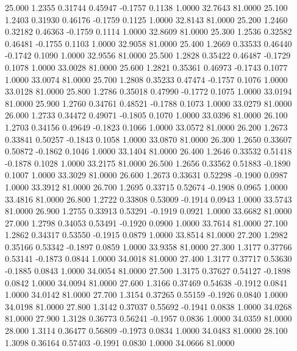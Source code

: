   25.000   1.2355   0.31744   0.45947  -0.1757   0.1138   1.0000  32.7643  81.0000
  25.100   1.2403   0.31930   0.46176  -0.1759   0.1125   1.0000  32.8143  81.0000
  25.200   1.2460   0.32182   0.46363  -0.1759   0.1114   1.0000  32.8609  81.0000
  25.300   1.2536   0.32582   0.46481  -0.1755   0.1103   1.0000  32.9058  81.0000
  25.400   1.2669   0.33533   0.46440  -0.1742   0.1090   1.0000  32.9556  81.0000
  25.500   1.2828   0.35422   0.46487  -0.1729   0.1078   1.0000  33.0028  81.0000
  25.600   1.2821   0.35361   0.46973  -0.1743   0.1077   1.0000  33.0074  81.0000
  25.700   1.2808   0.35233   0.47474  -0.1757   0.1076   1.0000  33.0128  81.0000
  25.800   1.2786   0.35018   0.47990  -0.1772   0.1075   1.0000  33.0194  81.0000
  25.900   1.2760   0.34761   0.48521  -0.1788   0.1073   1.0000  33.0279  81.0000
  26.000   1.2733   0.34472   0.49071  -0.1805   0.1070   1.0000  33.0396  81.0000
  26.100   1.2703   0.34156   0.49649  -0.1823   0.1066   1.0000  33.0572  81.0000
  26.200   1.2673   0.33841   0.50257  -0.1843   0.1058   1.0000  33.0870  81.0000
  26.300   1.2650   0.33607   0.50872  -0.1862   0.1046   1.0000  33.1404  81.0000
  26.400   1.2646   0.33532   0.51418  -0.1878   0.1028   1.0000  33.2175  81.0000
  26.500   1.2656   0.33562   0.51883  -0.1890   0.1007   1.0000  33.3029  81.0000
  26.600   1.2673   0.33631   0.52298  -0.1900   0.0987   1.0000  33.3912  81.0000
  26.700   1.2695   0.33715   0.52674  -0.1908   0.0965   1.0000  33.4816  81.0000
  26.800   1.2722   0.33808   0.53009  -0.1914   0.0943   1.0000  33.5743  81.0000
  26.900   1.2755   0.33913   0.53291  -0.1919   0.0921   1.0000  33.6682  81.0000
  27.000   1.2798   0.34053   0.53491  -0.1920   0.0900   1.0000  33.7614  81.0000
  27.100   1.2862   0.34317   0.53550  -0.1915   0.0879   1.0000  33.8514  81.0000
  27.200   1.2982   0.35166   0.53342  -0.1897   0.0859   1.0000  33.9358  81.0000
  27.300   1.3177   0.37766   0.53141  -0.1873   0.0844   1.0000  34.0018  81.0000
  27.400   1.3177   0.37717   0.53630  -0.1885   0.0843   1.0000  34.0054  81.0000
  27.500   1.3175   0.37627   0.54127  -0.1898   0.0842   1.0000  34.0094  81.0000
  27.600   1.3166   0.37469   0.54638  -0.1912   0.0841   1.0000  34.0142  81.0000
  27.700   1.3154   0.37265   0.55159  -0.1926   0.0840   1.0000  34.0198  81.0000
  27.800   1.3142   0.37037   0.55692  -0.1941   0.0838   1.0000  34.0268  81.0000
  27.900   1.3128   0.36773   0.56241  -0.1957   0.0836   1.0000  34.0359  81.0000
  28.000   1.3114   0.36477   0.56809  -0.1973   0.0834   1.0000  34.0483  81.0000
  28.100   1.3098   0.36164   0.57403  -0.1991   0.0830   1.0000  34.0666  81.0000
